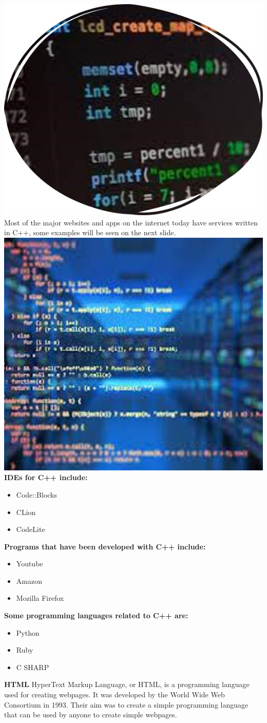 \documentclass{article}
\begin{document}
	\includegraphics[width=0.5\linewidth]{picture400}\\
	Most of the major websites and apps on the internet today have services written in C++, some examples will be seen on the next slide.\\\includegraphics[width=0.5\linewidth]{picture500}\\
	\textbf{IDEs for C++ include:}
	\begin{itemize}
		\item Code::Blocks
		\item CLion
		\item CodeLite
	\end{itemize}
\textbf{Programs that have been developed with C++ include:}
\begin{itemize}
	\item Youtube
	\item Amazon
	\item Mozilla Firefox
\end{itemize}
\textbf{Some programming languages related to C++ are:}
\begin{itemize}
	\item Python
	\item Ruby
	\item C SHARP
\end{itemize}
\textbf{HTML}
HyperText Markup Language, or HTML, is a programming language used for creating webpages. It was developed by the World Wide Web Consortium in 1993. Their aim was to create a simple programming language that can be used by anyone to create simple webpages.\\
\end{document}
